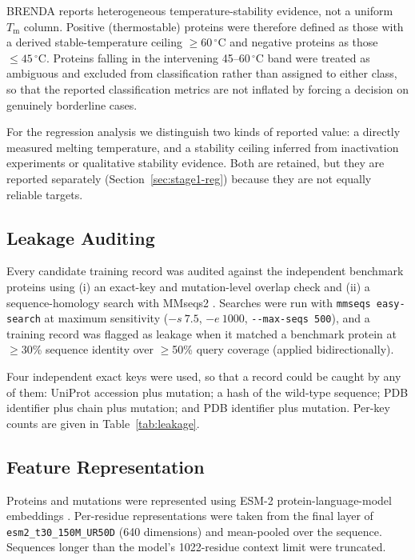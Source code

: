 \documentclass[journal,article,submit,moreauthors]{Definitions/mdpi}
\newcommand{\Tm}{\ensuremath{T_\mathrm{m}}}
\begin{document}
BRENDA reports heterogeneous temperature-stability evidence, not a uniform \Tm{} column.
Positive (thermostable) proteins were therefore defined as those with a derived
stable-temperature ceiling $\geq 60\,^{\circ}$C and negative proteins as those
$\leq 45\,^{\circ}$C. Proteins falling in the intervening 45--60\,$^{\circ}$C band were
treated as ambiguous and excluded from classification rather than assigned to either class,
so that the reported classification metrics are not inflated by forcing a decision on
genuinely borderline cases.

For the regression analysis we distinguish two kinds of reported value: a directly measured
melting temperature, and a stability ceiling inferred from inactivation experiments or
qualitative stability evidence. Both are retained, but they are reported separately
(Section~\ref{sec:stage1-reg}) because they are not equally reliable targets.

\subsection{Leakage Auditing}
\label{sec:leakage}

Every candidate training record was audited against the independent benchmark proteins
using (i) an exact-key and mutation-level overlap check and (ii) a sequence-homology search
with MMseqs2 \citep{steinegger2017mmseqs2}. Searches were run with
\texttt{mmseqs easy-search} at maximum sensitivity ($-s\ 7.5$, $-e\ 1000$,
\texttt{-{}-max-seqs 500}), and a training record was flagged as leakage when it matched a
benchmark protein at $\geq$30\% sequence identity over $\geq$50\% query coverage (applied
bidirectionally).

Four independent exact keys were used, so that a record could be caught by any of them:
UniProt accession plus mutation; a hash of the wild-type sequence; PDB identifier plus
chain plus mutation; and PDB identifier plus mutation. Per-key counts are given in
Table~\ref{tab:leakage}.

\subsection{Feature Representation}

Proteins and mutations were represented using ESM-2 protein-language-model embeddings
\citep{lin2023esm2}. Per-residue representations were taken from the final layer of
\texttt{esm2\_t30\_150M\_UR50D} (640 dimensions) and mean-pooled over the sequence.
Sequences longer than the model's 1022-residue context limit were truncated.
\end{document}
